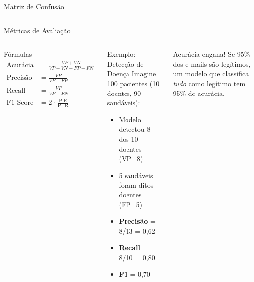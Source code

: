 \documentclass[aspectratio=169]{beamer}
\begin{document}
\begin{frame}[t]{Matriz de Confusão}
\begin{columns}[T]
\begin{center}
{
}
\end{center}
\end{columns}
\end{frame}

\begin{frame}{Métricas de Avaliação}
\begin{columns}[T]
\begin{block}{Fórmulas}
\begin{align*}
\text{Acurácia} &= \frac{VP + VN}{VP+VN+FP+FN} \\[6pt]
\text{Precisão} &= \frac{VP}{VP + FP} \\[6pt]
\text{Recall} &= \frac{VP}{VP + FN} \\[6pt]
\text{F1-Score} &= 2 \cdot \frac{\text{P} \cdot \text{R}}{\text{P} + \text{R}}
\end{align*}
\end{block}

\begin{exampleblock}{Exemplo: Detecção de Doença}
Imagine 100 pacientes (10 doentes, 90 saudáveis):
\begin{itemize}
  \item Modelo detectou 8 dos 10 doentes (VP=8)
  \item 5 saudáveis foram ditos doentes (FP=5)
  \item \textbf{Precisão} = 8/13 = 0,62
  \item \textbf{Recall} = 8/10 = 0,80
  \item \textbf{F1} = 0,70
\end{itemize}
\end{exampleblock}
\begin{alertblock}{Acurácia engana!}
  Se 95\% dos e-mails são legítimos, um modelo que classifica \textit{tudo} como legítimo tem 95\% de acurácia.
\end{alertblock}
\end{columns}
\end{frame}
\end{document}

